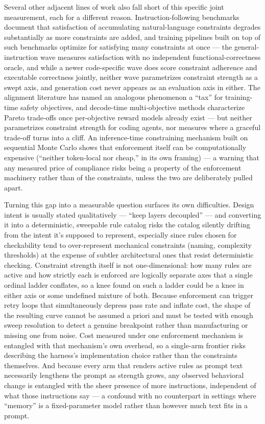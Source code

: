 \documentclass[11pt]{article}
\begin{document}
Several other adjacent lines of work also fall short of this specific joint measurement, each for a different reason. Instruction-following benchmarks document that satisfaction of accumulating natural-language constraints degrades substantially as more constraints are added, and training pipelines built on top of such benchmarks optimize for satisfying many constraints at once --- the general-instruction wave measures satisfaction with no independent functional-correctness oracle, and while a newer code-specific wave does score constraint adherence and executable correctness jointly, neither wave parametrizes constraint strength as a swept axis, and generation cost never appears as an evaluation axis in either. The alignment literature has named an analogous phenomenon a ``tax'' for training-time safety objectives, and decode-time multi-objective methods characterize Pareto trade-offs once per-objective reward models already exist --- but neither parametrizes constraint strength for coding agents, nor measures where a graceful trade-off turns into a cliff. An inference-time constraining mechanism built on sequential Monte Carlo shows that enforcement itself can be computationally expensive (``neither token-local nor cheap,'' in its own framing) --- a warning that any measured price of compliance risks being a property of the enforcement machinery rather than of the constraints, unless the two are deliberately pulled apart.

Turning this gap into a measurable question surfaces its own difficulties. Design intent is usually stated qualitatively --- ``keep layers decoupled'' --- and converting it into a deterministic, sweepable rule catalog risks the catalog silently drifting from the intent it's supposed to represent, especially since rules chosen for checkability tend to over-represent mechanical constraints (naming, complexity thresholds) at the expense of subtler architectural ones that resist deterministic checking. Constraint strength itself is not one-dimensional: how many rules are active and how strictly each is enforced are logically separate axes that a single ordinal ladder conflates, so a knee found on such a ladder could be a knee in either axis or some undefined mixture of both. Because enforcement can trigger retry loops that simultaneously depress pass rate and inflate cost, the shape of the resulting curve cannot be assumed a priori and must be tested with enough sweep resolution to detect a genuine breakpoint rather than manufacturing or missing one from noise. Cost measured under one enforcement mechanism is entangled with that mechanism's own overhead, so a single-arm frontier risks describing the harness's implementation choice rather than the constraints themselves. And because every arm that renders active rules as prompt text necessarily lengthens the prompt as strength grows, any observed behavioral change is entangled with the sheer presence of more instructions, independent of what those instructions say --- a confound with no counterpart in settings where ``memory'' is a fixed-parameter model rather than however much text fits in a prompt.
\end{document}
